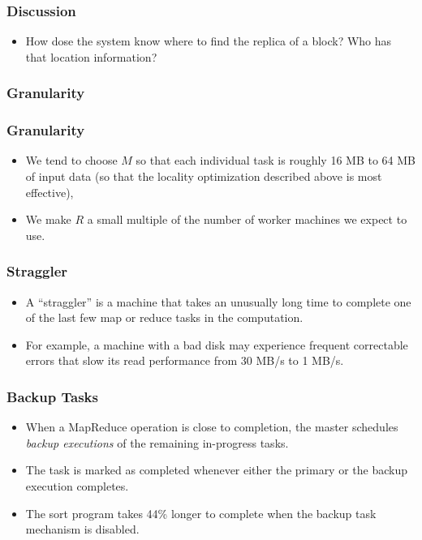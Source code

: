 \documentclass{beamer}
\begin{document}
\begin{frame}
  \frametitle{Discussion}
  \begin{itemize}
    \item How dose the system know where to find the replica of a
      block? Who has that location information?
  \end{itemize}
\end{frame}

\subsubsection{Granularity}

\begin{frame}
  \frametitle{Granularity}
  \begin{itemize}
    \item We tend to choose $M$ so that each individual task is
      roughly 16 MB to 64 MB of input data (so that the locality
      optimization described above is most effective), 
    \item We make $R$ a small multiple of the number of worker
      machines we expect to use.
  \end{itemize}
\end{frame}

\begin{frame}
  \frametitle{Straggler}
  \begin{itemize}
    \item A ``straggler'' is a machine that takes an unusually long
      time to complete one of the last few map or reduce tasks in the
      computation.
    \item For example, a machine with a bad disk may experience
      frequent correctable errors that slow its read performance from
      30 MB/s to 1 MB/s.
  \end{itemize}
\end{frame}

\begin{frame}
  \frametitle{Backup Tasks}
  \begin{itemize}
    \item When a MapReduce operation is close to completion, the
      master schedules {\em backup executions} of the remaining
      in-progress tasks.
    \item The task is marked as completed whenever either the primary
      or the backup execution completes.
    \item The sort program takes 44\% longer to complete when the
      backup task mechanism is disabled.
  \end{itemize}
\end{frame}
\end{document}
